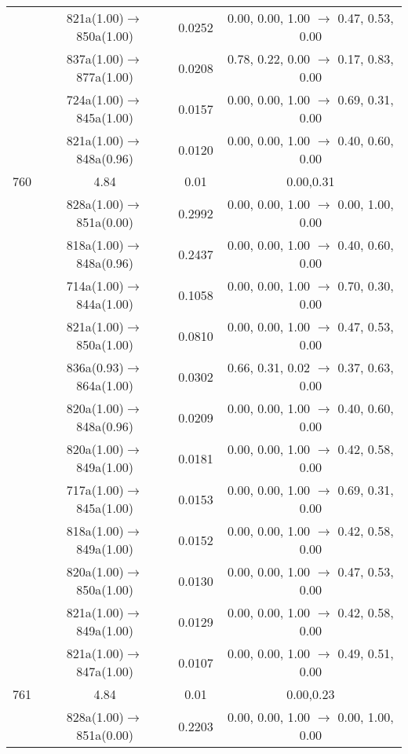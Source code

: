 \documentclass[10pt,a4paper]{article}
\begin{document}
\begin{longtable}{c|c|c|c}
 	& 821a(1.00)$\rightarrow$850a(1.00) &	 0.0252 &	 0.00, 0.00, 1.00 $\rightarrow$ 0.47, 0.53, 0.00 \\ 
 	& 837a(1.00)$\rightarrow$877a(1.00) &	 0.0208 &	 0.78, 0.22, 0.00 $\rightarrow$ 0.17, 0.83, 0.00 \\ 
 	& 724a(1.00)$\rightarrow$845a(1.00) &	 0.0157 &	 0.00, 0.00, 1.00 $\rightarrow$ 0.69, 0.31, 0.00 \\ 
 	& 821a(1.00)$\rightarrow$848a(0.96) &	 0.0120 &	 0.00, 0.00, 1.00 $\rightarrow$ 0.40, 0.60, 0.00 \\ 
 \hline760 &	 4.84 &	 0.01 &	 0.00,0.31 \\ 
  	& 828a(1.00)$\rightarrow$851a(0.00) &	 0.2992 &	 0.00, 0.00, 1.00 $\rightarrow$ 0.00, 1.00, 0.00 \\ 
 	& 818a(1.00)$\rightarrow$848a(0.96) &	 0.2437 &	 0.00, 0.00, 1.00 $\rightarrow$ 0.40, 0.60, 0.00 \\ 
 	& 714a(1.00)$\rightarrow$844a(1.00) &	 0.1058 &	 0.00, 0.00, 1.00 $\rightarrow$ 0.70, 0.30, 0.00 \\ 
 	& 821a(1.00)$\rightarrow$850a(1.00) &	 0.0810 &	 0.00, 0.00, 1.00 $\rightarrow$ 0.47, 0.53, 0.00 \\ 
 	& 836a(0.93)$\rightarrow$864a(1.00) &	 0.0302 &	 0.66, 0.31, 0.02 $\rightarrow$ 0.37, 0.63, 0.00 \\ 
 	& 820a(1.00)$\rightarrow$848a(0.96) &	 0.0209 &	 0.00, 0.00, 1.00 $\rightarrow$ 0.40, 0.60, 0.00 \\ 
 	& 820a(1.00)$\rightarrow$849a(1.00) &	 0.0181 &	 0.00, 0.00, 1.00 $\rightarrow$ 0.42, 0.58, 0.00 \\ 
 	& 717a(1.00)$\rightarrow$845a(1.00) &	 0.0153 &	 0.00, 0.00, 1.00 $\rightarrow$ 0.69, 0.31, 0.00 \\ 
 	& 818a(1.00)$\rightarrow$849a(1.00) &	 0.0152 &	 0.00, 0.00, 1.00 $\rightarrow$ 0.42, 0.58, 0.00 \\ 
 	& 820a(1.00)$\rightarrow$850a(1.00) &	 0.0130 &	 0.00, 0.00, 1.00 $\rightarrow$ 0.47, 0.53, 0.00 \\ 
 	& 821a(1.00)$\rightarrow$849a(1.00) &	 0.0129 &	 0.00, 0.00, 1.00 $\rightarrow$ 0.42, 0.58, 0.00 \\ 
 	& 821a(1.00)$\rightarrow$847a(1.00) &	 0.0107 &	 0.00, 0.00, 1.00 $\rightarrow$ 0.49, 0.51, 0.00 \\ 
 \hline761 &	 4.84 &	 0.01 &	 0.00,0.23 \\ 
  	& 828a(1.00)$\rightarrow$851a(0.00) &	 0.2203 &	 0.00, 0.00, 1.00 $\rightarrow$ 0.00, 1.00, 0.00 \\ 

\end{longtable}
\end{document}
